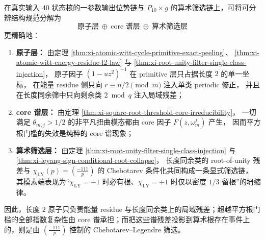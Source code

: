 \begin{corollary}\label{cor:xi-atomic-core-arithmetic-trichotomy}
在真实输入 \(40\) 状态核的一参数输出位势链与 \(P_{10}\times g\) 的算术筛选链上，可将可分辨结构规范分解为
\[
\boxed{\;
\text{原子层}\ \oplus\ \text{core 谱层}\ \oplus\ \text{算术筛选层}\;}
\]
更精确地：
\begin{enumerate}
  \item \textbf{原子层：}
        由定理 \ref{thm:xi-atomic-witt-cycle-primitive-exact-peeling}、
        \ref{thm:xi-atomic-witt-energy-residue-l2-law} 与
        \ref{thm:xi-root-unity-filter-single-class-injection}，
        原子因子 \((1-uz^2)^{-1}\) 在 primitive 层只占据长度 \(2\) 的单一坐标，
        在能量 residue 侧只向 \(r\equiv n/2\pmod m\) 注入单类 periodic 修正，
        并且在长度同余筛中只向剩余类 \(2\bmod q\) 注入局域残差；
  \item \textbf{core 谱层：}
        由定理 \ref{thm:xi-square-root-threshold-core-irreducibility}，
        一切满足 \(\theta_{m,j}>1/2\) 的非平凡扭曲模态都由 core 因子 \(F(z,\omega_m^j)\) 产生，
        因而平方根门槛的失效是纯粹的 core 谱现象；
  \item \textbf{算术筛选层：}
        由定理 \ref{thm:xi-root-unity-filter-single-class-injection} 与
        \ref{thm:xi-leyang-sign-conditional-root-collapse}，
        长度同余类的 root-of-unity 残差与
        \(\chi_{\mathrm{LY}}(p)=\left(\frac{-111}{p}\right)\) 的 Chebotarev 条件化共同构成一条显式筛选链，
        其模素端表现为“\(\chi_{\mathrm{LY}}=-1\) 时必有根、\(\chi_{\mathrm{LY}}=+1\) 时仅以密度 \(1/3\) 留根”的坍缩律。
\end{enumerate}
因此，长度 \(2\) 原子只负责能量 residue 与长度同余类上的局域残差；超越平方根门槛的全部指数复杂性由 core 谱承担；而把这些谱残差投影到算术根存在事件上的，则是由 \(\left(\frac{-111}{p}\right)\) 控制的 Chebotarev--Legendre 筛选。
\end{corollary}






\endinput
